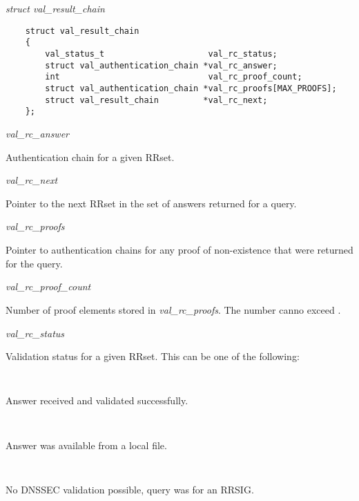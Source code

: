 \begin{description}

\item {\it struct val\_result\_chain}\verb" "

\begin{verbatim}
    struct val_result_chain
    {
        val_status_t                     val_rc_status;
        struct val_authentication_chain *val_rc_answer;
        int                              val_rc_proof_count;
        struct val_authentication_chain *val_rc_proofs[MAX_PROOFS];
        struct val_result_chain         *val_rc_next;
    };
\end{verbatim}

\begin{description}

\item {\it val\_rc\_answer} \verb" "

Authentication chain for a given RRset.

\item {\it val\_rc\_next} \verb" "

Pointer to the next RRset in the set of answers returned for a query.

\item {\it val\_rc\_proofs} \verb" "

Pointer to authentication chains for any proof of non-existence that were
returned for the query.

\item {\it val\_rc\_proof\_count} \verb" "

Number of proof elements stored in {\it val\_rc\_proofs}. The number canno
exceed .

\item {\it val\_rc\_status} \verb" "

Validation status for a given RRset.  This can be one of the following:

\begin{description}
\item {}\verb" "

Answer received and validated successfully.

\item {}\verb" "

Answer was available from a local file.

\item {}\verb" "

No DNSSEC validation possible, query was for
an RRSIG.


\end{description}
\end{description}
\end{description}
